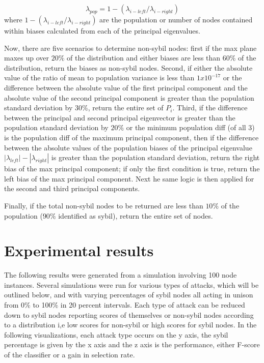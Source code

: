 \documentclass{article}
\begin{document}
\begin{equation}
\lambda_{pop} = 1-(\lambda_{i-left}/\lambda_{i-right})
\end{equation}
where $1-(\lambda_{i-left}/\lambda_{i-right})$  are the population or number of nodes contained within biases calculated from each of the principal eigenvalues.

Now, there are five scenarios to determine non-sybil nodes: first if the max plane maxes up over $20\%$ of the distribution and either biases are less than $60\%$ of the distribution, return the biases as non-sybil nodes. Second, if either the absolute value of the ratio of mean to population variance is less than $1x10^{-17}$ or the difference between the absolute value of the first principal component and the  absolute value of the second principal component is greater than the population standard deviation by $30\%$, return the entire set of $P_i$. Third, if the difference between the principal and second principal eigenvector is greater than the population standard deviation by $20\%$ or the minimum population diff (of all 3) is the population diff of the maximum principal component, then if the difference between the absolute values of the population biases of the principal eigenvalue $|\lambda_{left}| - |\lambda_{right}|$ is greater than the population standard deviation, return the right bias of the max principal component; if only the first condition is true, return the left bias of the max principal component. Next he same logic is then applied for the second and third principal components. 

Finally, if the total non-sybil nodes to be returned are less than $10\%$ of the population ($90\%$ identified as sybil), return the entire set of nodes.

\section{Experimental results}
The following results were generated from a simulation involving 100 node instances. Several simulations were run for various types of attacks, which will be outlined below, and with varying percentages of sybil nodes all acting in unison from 0\% to 100\% in 20 percent intervals. Each type of attack can be reduced down to sybil nodes reporting scores of themselves or non-sybil nodes according to a distribution i,e low scores for non-sybil or high scores for sybil nodes. In the following visualizations, each attack type occurs on the y axis, the sybil percentage is given by the x axis and the z axis is the performance, either F-score of the classifier or a gain in selection rate.
\end{document}
